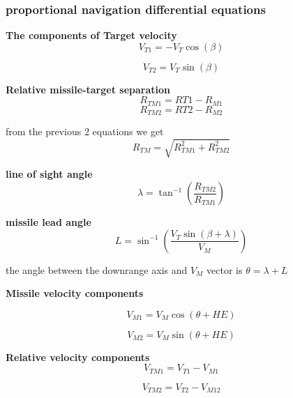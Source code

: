 \subsubsection*{proportional navigation differential equations}

\textbf{The components of Target velocity} 
\begin{equation}
	V_{T1} = - V_T \cos(\beta)
\end{equation}

\begin{equation}
V_{T2} =  V_T \sin(\beta)
\end{equation}

\textbf{Relative missile-target separation}
\begin{equation}
	R_{TM1} = R{T1} - R_{M1}
\end{equation}
\begin{equation}
R_{TM2} = R{T2} - R_{M2}
\end{equation}

from the previous 2 equations we get
\begin{equation}
	R_{TM} = \sqrt{R_{TM1}^2 + R_{TM2}^2}
	\label{RTM}
\end{equation}

\textbf{line of sight angle}
\begin{equation}
	\lambda = \tan^{-1} (\dfrac{R_{TM2}}{R_{TM1}})
	\label{lambda}
\end{equation}

\textbf{missile lead angle} 
\begin{equation}
	L= \sin^{-1}(\dfrac{V_T \sin(\beta + \lambda)}{V_M})
\end{equation}

the angle between the downrange axis and $V_M$ vector is $\theta = \lambda + L$

\textbf{Missile velocity components} 

\begin{equation}
	V_{M1} = V_M \cos (\theta + HE)
\end{equation}

\begin{equation}
V_{M2} = V_M \sin (\theta + HE)
\end{equation}

\textbf{Relative velocity components}
\begin{equation}
	V_{TM1} = V_{T1} - V_{M1}
\end{equation}

\begin{equation}
V_{TM2} = V_{T2} - V_{M12}
\end{equation}


